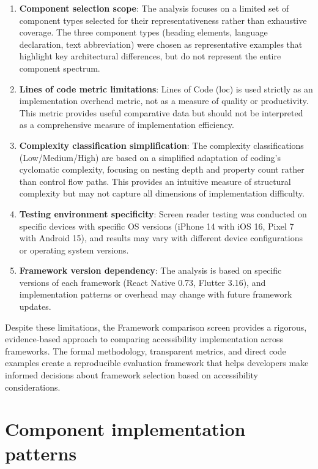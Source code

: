 \begin{enumerate}
    \item \textbf{Component selection scope}: The analysis focuses on a limited set of component types selected for their representativeness rather than exhaustive coverage. The three component types (heading elements, language declaration, text abbreviation) were chosen as representative examples that highlight key architectural differences, but do not represent the entire component spectrum.
    
    \item \textbf{Lines of code metric limitations}: Lines of Code (\acrshort{loc}) is used strictly as an implementation overhead metric, not as a measure of quality or productivity. This metric provides useful comparative data but should not be interpreted as a comprehensive measure of implementation efficiency.
    
    \item \textbf{Complexity classification simplification}: The complexity classifications (Low/Medium/High) are based on a simplified adaptation of coding's cyclomatic complexity, focusing on nesting depth and property count rather than control flow paths. This provides an intuitive measure of structural complexity but may not capture all dimensions of implementation difficulty.
    
    \item \textbf{Testing environment specificity}: Screen reader testing was conducted on specific devices with specific OS versions (iPhone 14 with iOS 16, Pixel 7 with Android 15), and results may vary with different device configurations or operating system versions.
    
    \item \textbf{Framework version dependency}: The analysis is based on specific versions of each framework (React Native 0.73, Flutter 3.16), and implementation patterns or overhead may change with future framework updates.
\end{enumerate}

Despite these limitations, the Framework comparison screen provides a rigorous, evidence-based approach to comparing accessibility implementation across frameworks. The formal methodology, transparent metrics, and direct code examples create a reproducible evaluation framework that helps developers make informed decisions about framework selection based on accessibility considerations.

\section{Component implementation patterns}
\label{subsec:implementation-patterns}

